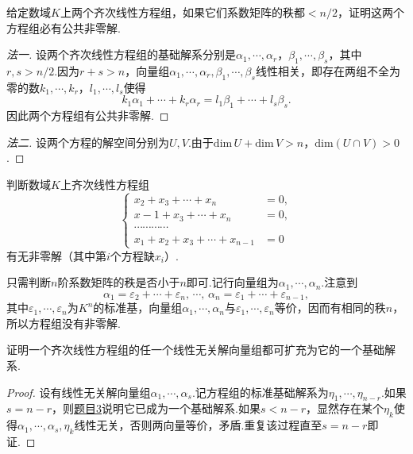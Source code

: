 \begin{prob}[5]
	给定数域$K$上两个齐次线性方程组，如果它们系数矩阵的秩都$<n/2$，证明这两个方程组必有公共非零解.
\end{prob}
\begin{proof}[法一]
	设两个齐次线性方程组的基础解系分别是$\alpha_1,\cdots,\alpha_r$，$\beta_1,\cdots,\beta_s$，其中$r,s>n/2$.因为$r+s>n$，向量组$\alpha_1,\cdots,\alpha_r,\beta_1,\cdots,\beta_s$线性相关，即存在两组不全为零的数$k_1,\cdots,k_r$，$l_1,\cdots,l_s$使得
	\[
		k_1\alpha_1+\cdots+k_r\alpha_r=l_1\beta_1+\cdots+l_s\beta_s.
	\]
	因此两个方程组有公共非零解.
\end{proof}
\begin{proof}[法二]
	设两个方程的解空间分别为$U,V$.由于$\mathrm{dim}\,U+\mathrm{dim}\,V>n$，$\mathrm{dim}(U\cap V)>0$.
\end{proof}
\begin{prob}[6]
	判断数域$K$上齐次线性方程组
	\[\left\{
		\begin{array}{cc}
			x_2+x_3+\cdots+x_n         & =0, \\
			x-1+x_3+\cdots+x_n         & =0, \\
			\cdots\cdots\cdots\cdots   &     \\
			x_1+x_2+x_3+\cdots+x_{n-1} & =0
		\end{array}
		\right.\]
	有无非零解（其中第$i$个方程缺$x_i$）.
\end{prob}
\begin{sol}
	只需判断$n$阶系数矩阵的秩是否小于$n$即可.记行向量组为$\alpha_1,\cdots,\alpha_n$.注意到
	\[
		\alpha_1=\varepsilon_2+\cdots+\varepsilon_n,\,\cdots,\,\alpha_n=\varepsilon_1+\cdots+\varepsilon_{n-1},
	\]
	其中$\varepsilon_1,\cdots,\varepsilon_n$为$K^n$的标准基，向量组$\alpha_1,\cdots,\alpha_n$与$\varepsilon_1,\cdots,\varepsilon_n$等价，因而有相同的秩$n$，所以方程组没有非零解.
\end{sol}
\begin{prob}[7]
	证明一个齐次线性方程组的任一个线性无关解向量组都可扩充为它的一个基础解系.
\end{prob}
\begin{proof}
	设有线性无关解向量组$\alpha_1,\cdots,\alpha_s$.记方程组的标准基础解系为$\eta_1,\cdots,\eta_{n-r}$.如果$s=n-r$，则\hyperlink{BasicSolution}{题目3}说明它已成为一个基础解系.如果$s<n-r$，显然存在某个$\eta_k$使得$\alpha_1,\cdots,\alpha_s,\eta_k$线性无关，否则两向量等价，矛盾.重复该过程直至$s=n-r$即证.
\end{proof}
